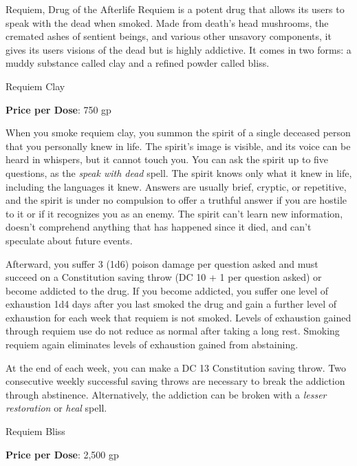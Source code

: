 \documentclass[10pt,a4paper,twoside,bg=print,twocolumn,openany,nodeprecatedcode]{dndbook}
\begin{document}
\begin{DndSidebar}[float=!b]{Requiem, Drug of the Afterlife}
Requiem is a potent drug that allows its users to speak with the dead when smoked. Made from death's head mushrooms, the cremated ashes of sentient beings, and various other unsavory components, it gives its users visions of the dead but is highly addictive. It comes in two forms: a muddy substance called clay and a refined powder called bliss.



Requiem Clay



\textbf{Price per Dose}: 750 gp



When you smoke requiem clay, you summon the spirit of a single deceased person that you personally knew in life. The spirit's image is visible, and its voice can be heard in whispers, but it cannot touch you. You can ask the spirit up to five questions, as the \textit{speak with dead} spell. The spirit knows only what it knew in life, including the languages it knew. Answers are usually brief, cryptic, or repetitive, and the spirit is under no compulsion to offer a truthful answer if you are hostile to it or if it recognizes you as an enemy. The spirit can't learn new information, doesn't comprehend anything that has happened since it died, and can't speculate about future events.



Afterward, you suffer 3 (1d6) poison damage per question asked and must succeed on a Constitution saving throw (DC 10 + 1 per question asked) or become addicted to the drug. If you become addicted, you suffer one level of exhaustion 1d4 days after you last smoked the drug and gain a further level of exhaustion for each week that requiem is not smoked. Levels of exhaustion gained through requiem use do not reduce as normal after taking a long rest. Smoking requiem again eliminates levels of exhaustion gained from abstaining.



At the end of each week, you can make a DC 13 Constitution saving throw. Two consecutive weekly successful saving throws are necessary to break the addiction through abstinence. Alternatively, the addiction can be broken with a \textit{lesser restoration} or \textit{heal} spell.



Requiem Bliss



\textbf{Price per Dose}: 2,500 gp




\end{DndSidebar}
\end{document}
